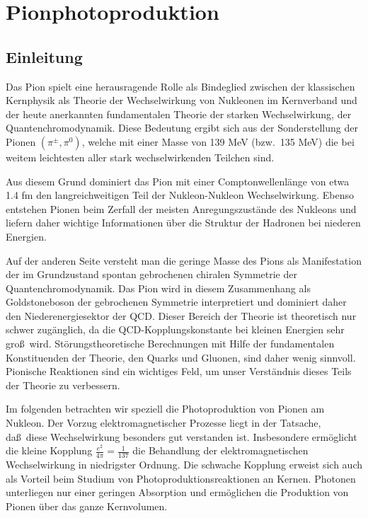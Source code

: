 \chapter{Pionphotoproduktion}
\section{Einleitung}
Das Pion spielt eine herausragende Rolle als Bindeglied zwischen 
der klassischen Kernphysik als Theorie der Wechselwirkung von 
Nukleonen im Kernverband und der heute anerkannten fundamentalen
Theorie der starken Wechselwirkung, der Quantenchromodynamik.  
Diese Bedeutung ergibt sich aus der Sonderstellung der Pionen
$(\pi^\pm,\pi^0)$, welche mit einer Masse von 139 MeV (bzw.~135 MeV)
die bei weitem leichtesten aller stark wechselwirkenden
Teilchen sind. 

Aus diesem Grund dominiert das Pion mit einer Comptonwellenl\"ange
von etwa 1.4 fm den langreichweitigen Teil der Nukleon-Nukleon
Wechselwirkung. Ebenso entstehen Pionen beim Zerfall der meisten
Anregungszust\"ande des Nukleons und liefern daher wichtige Informationen 
\"uber die Struktur der Hadronen bei niederen Energien.

Auf der anderen Seite versteht man die geringe Masse des Pions
als Manifestation der im Grundzustand spontan 
gebrochenen chiralen Symmetrie der Quantenchromodynamik.
Das Pion wird in diesem Zusammenhang als Goldstoneboson der
gebrochenen Symmetrie interpretiert und dominiert daher
den Niederenergiesektor der QCD. Dieser Bereich der Theorie
ist theoretisch nur schwer zug\"anglich, da die QCD-Kopplungskonstante
bei kleinen Energien sehr gro\ss\ wird. St\"orungstheoretische
Berechnungen mit Hilfe der fundamentalen Konstituenden der Theorie, den
Quarks und Gluonen, sind daher wenig sinnvoll. Pionische 
Reaktionen  sind ein wichtiges Feld, um 
unser Verst\"andnis dieses Teils der Theorie zu verbessern.

Im folgenden betrachten wir speziell die Photoproduktion 
von Pionen am Nukleon. Der Vorzug elektromagnetischer  
Prozesse liegt in der Tatsache, da\ss\  diese Wechselwirkung
besonders gut verstanden ist. Insbesondere erm\"oglicht die
kleine Kopplung $\frac{e^2}{4\pi}=\frac{1}{137}$ die Behandlung
der elektromagnetischen Wechselwirkung in niedrigster Ordnung. 
Die schwache Kopplung erweist sich auch als Vorteil
beim Studium von Photoproduktionsreaktionen an Kernen.
Photonen unterliegen nur einer geringen Absorption und erm\"oglichen 
die Produktion von Pionen \"uber das ganze Kernvolumen.

